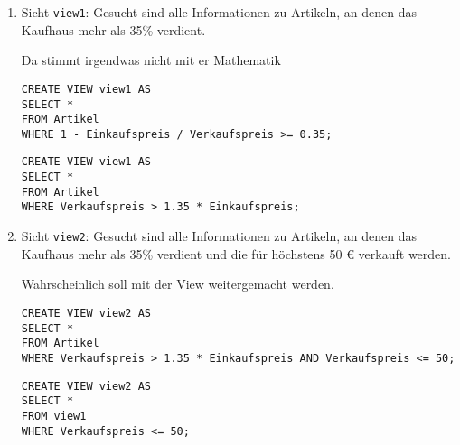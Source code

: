 \documentclass{lehramt-informatik-aufgabe}
\begin{document}
\begin{enumerate}


\item Sicht \verb|view1|: Gesucht sind alle Informationen zu Artikeln,
an denen das Kaufhaus mehr als 35\% verdient.

\begin{antwort}[falsch]
Da stimmt irgendwas nicht mit er Mathematik
\begin{verbatim}
CREATE VIEW view1 AS
SELECT *
FROM Artikel
WHERE 1 - Einkaufspreis / Verkaufspreis >= 0.35;
\end{verbatim}
\end{antwort}

\begin{antwort}[muster]
\begin{verbatim}
CREATE VIEW view1 AS
SELECT *
FROM Artikel
WHERE Verkaufspreis > 1.35 * Einkaufspreis;
\end{verbatim}
\end{antwort}


\item Sicht \verb|view2|: Gesucht sind alle Informationen zu Artikeln,
an denen das Kaufhaus mehr als 35\% verdient und die für höchstens 50 €
verkauft werden.

\begin{antwort}[richtig]
Wahrscheinlich soll mit der View weitergemacht werden.
\begin{verbatim}
CREATE VIEW view2 AS
SELECT *
FROM Artikel
WHERE Verkaufspreis > 1.35 * Einkaufspreis AND Verkaufspreis <= 50;
\end{verbatim}
\end{antwort}

\begin{antwort}[muster]
\begin{verbatim}
CREATE VIEW view2 AS
SELECT *
FROM view1
WHERE Verkaufspreis <= 50;
\end{verbatim}
\end{antwort}
\end{enumerate}
\end{document}
